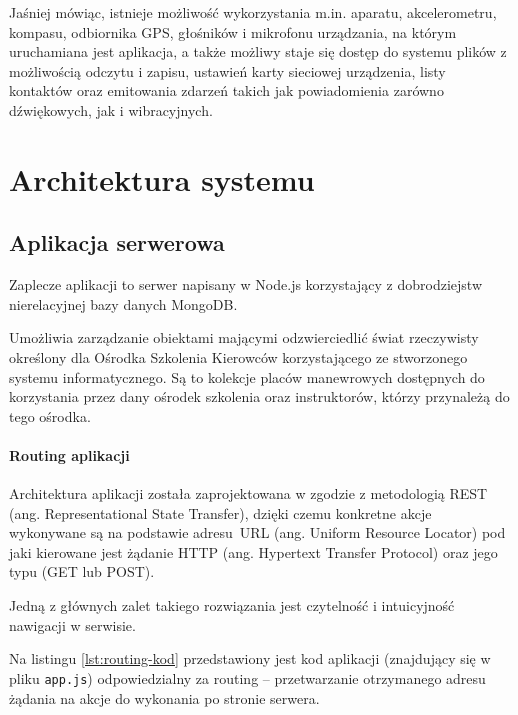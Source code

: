 \documentclass[twoside,a4paper,openright,12pt]{book}
\begin{document}
Jaśniej mówiąc, istnieje możliwość wykorzystania m.in. aparatu, akcelerometru, kompasu, odbiornika GPS, głośników i mikrofonu urządzania, na którym uruchamiana jest aplikacja, a także możliwy staje się dostęp do systemu plików z możliwością odczytu i zapisu, ustawień karty sieciowej urządzenia, listy kontaktów oraz emitowania zdarzeń takich jak powiadomienia zarówno dźwiękowych, jak i wibracyjnych.



\chapter{Architektura systemu}

\section{Aplikacja serwerowa}
Zaplecze aplikacji to serwer napisany w Node.js korzystający z dobrodziejstw nierelacyjnej bazy danych MongoDB.

Umożliwia zarządzanie obiektami mającymi odzwierciedlić świat rzeczywisty określony dla Ośrodka Szkolenia Kierowców korzystającego ze stworzonego systemu informatycznego. Są to kolekcje placów manewrowych dostępnych do korzystania przez dany ośrodek szkolenia oraz instruktorów, którzy przynależą do tego ośrodka.



\subsubsection{Routing aplikacji}

Architektura aplikacji została zaprojektowana w zgodzie z metodologią REST (ang. Representational State Transfer), dzięki czemu konkretne akcje wykonywane są na podstawie adresu~URL (ang. Uniform Resource Locator) pod jaki kierowane jest żądanie HTTP (ang. Hypertext Transfer Protocol) oraz jego typu (GET lub POST).

Jedną z głównych zalet takiego rozwiązania jest czytelność i intuicyjność nawigacji w serwisie.

Na listingu \ref{lst:routing-kod} przedstawiony jest kod aplikacji (znajdujący się w pliku \texttt{app.js}) odpowiedzialny za routing -- przetwarzanie otrzymanego adresu żądania na akcje do wykonania po stronie serwera. \\
\newpage
\end{document}
